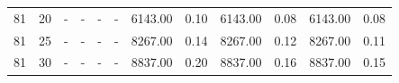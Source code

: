 \begin{table}
\begin{tabular}{@{}rrrrrrrrrrrr@{}}
81                                                                               & 20                                                                                    & -                                                                      & -                                                                  & -                                                                      & -                                                                 & 6143.00                                                                     & 0.10                                                                   & 6143.00                                                                     & 0.08                                                                   & 6143.00                                                                     & 0.08                                                                   \\
81                                                                               & 25                                                                                    & -                                                                      & -                                                                  & -                                                                      & -                                                                 & 8267.00                                                                     & 0.14                                                                   & 8267.00                                                                     & 0.12                                                                   & 8267.00                                                                     & 0.11                                                                   \\
81                                                                               & 30                                                                                    & -                                                                      & -                                                                  & -                                                                      & -                                                                 & 8837.00                                                                     & 0.20                                                                   & 8837.00                                                                     & 0.16                                                                   & 8837.00                                                                     & 0.15                                                                   \\

\end{tabular}
\end{table}
